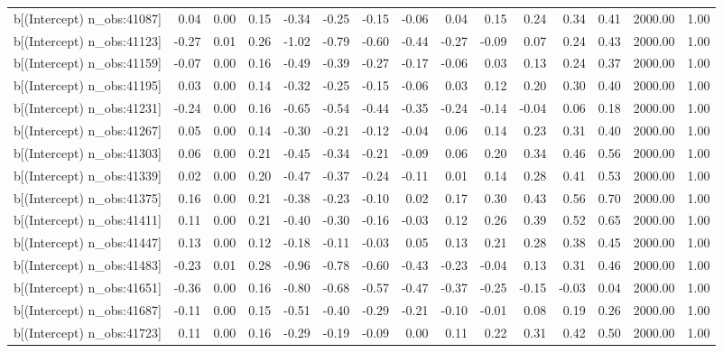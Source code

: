 \begin{table}[ht]
\begin{tabular}{rrrrrrrrrrrrrrr}
  b[(Intercept) n\_obs:41087] & 0.04 & 0.00 & 0.15 & -0.34 & -0.25 & -0.15 & -0.06 & 0.04 & 0.15 & 0.24 & 0.34 & 0.41 & 2000.00 & 1.00 \\ 
  b[(Intercept) n\_obs:41123] & -0.27 & 0.01 & 0.26 & -1.02 & -0.79 & -0.60 & -0.44 & -0.27 & -0.09 & 0.07 & 0.24 & 0.43 & 2000.00 & 1.00 \\ 
  b[(Intercept) n\_obs:41159] & -0.07 & 0.00 & 0.16 & -0.49 & -0.39 & -0.27 & -0.17 & -0.06 & 0.03 & 0.13 & 0.24 & 0.37 & 2000.00 & 1.00 \\ 
  b[(Intercept) n\_obs:41195] & 0.03 & 0.00 & 0.14 & -0.32 & -0.25 & -0.15 & -0.06 & 0.03 & 0.12 & 0.20 & 0.30 & 0.40 & 2000.00 & 1.00 \\ 
  b[(Intercept) n\_obs:41231] & -0.24 & 0.00 & 0.16 & -0.65 & -0.54 & -0.44 & -0.35 & -0.24 & -0.14 & -0.04 & 0.06 & 0.18 & 2000.00 & 1.00 \\ 
  b[(Intercept) n\_obs:41267] & 0.05 & 0.00 & 0.14 & -0.30 & -0.21 & -0.12 & -0.04 & 0.06 & 0.14 & 0.23 & 0.31 & 0.40 & 2000.00 & 1.00 \\ 
  b[(Intercept) n\_obs:41303] & 0.06 & 0.00 & 0.21 & -0.45 & -0.34 & -0.21 & -0.09 & 0.06 & 0.20 & 0.34 & 0.46 & 0.56 & 2000.00 & 1.00 \\ 
  b[(Intercept) n\_obs:41339] & 0.02 & 0.00 & 0.20 & -0.47 & -0.37 & -0.24 & -0.11 & 0.01 & 0.14 & 0.28 & 0.41 & 0.53 & 2000.00 & 1.00 \\ 
  b[(Intercept) n\_obs:41375] & 0.16 & 0.00 & 0.21 & -0.38 & -0.23 & -0.10 & 0.02 & 0.17 & 0.30 & 0.43 & 0.56 & 0.70 & 2000.00 & 1.00 \\ 
  b[(Intercept) n\_obs:41411] & 0.11 & 0.00 & 0.21 & -0.40 & -0.30 & -0.16 & -0.03 & 0.12 & 0.26 & 0.39 & 0.52 & 0.65 & 2000.00 & 1.00 \\ 
  b[(Intercept) n\_obs:41447] & 0.13 & 0.00 & 0.12 & -0.18 & -0.11 & -0.03 & 0.05 & 0.13 & 0.21 & 0.28 & 0.38 & 0.45 & 2000.00 & 1.00 \\ 
  b[(Intercept) n\_obs:41483] & -0.23 & 0.01 & 0.28 & -0.96 & -0.78 & -0.60 & -0.43 & -0.23 & -0.04 & 0.13 & 0.31 & 0.46 & 2000.00 & 1.00 \\ 
  b[(Intercept) n\_obs:41651] & -0.36 & 0.00 & 0.16 & -0.80 & -0.68 & -0.57 & -0.47 & -0.37 & -0.25 & -0.15 & -0.03 & 0.04 & 2000.00 & 1.00 \\ 
  b[(Intercept) n\_obs:41687] & -0.11 & 0.00 & 0.15 & -0.51 & -0.40 & -0.29 & -0.21 & -0.10 & -0.01 & 0.08 & 0.19 & 0.26 & 2000.00 & 1.00 \\ 
  b[(Intercept) n\_obs:41723] & 0.11 & 0.00 & 0.16 & -0.29 & -0.19 & -0.09 & 0.00 & 0.11 & 0.22 & 0.31 & 0.42 & 0.50 & 2000.00 & 1.00 \\ 

\end{tabular}
\end{table}
